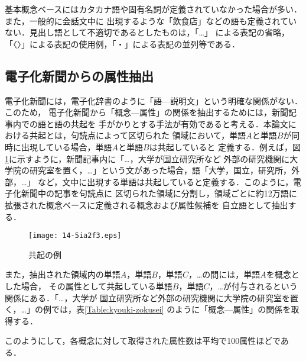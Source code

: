 \documentclass[japanese]{jnlp_1.3e}
\begin{document}
\begin{table}[t]

\end{table}

基本概念ベースにはカタカナ語や固有名詞が定義されていなかった場合が多い．また，一般的に会話文中に
出現するような「飲食店」などの語も定義されていない．見出し語として不適切であるとしたものは，「…」
による表記の省略，「〈〉」による表記の使用例，「・」による表記の並列等である．



\subsection{電子化新聞からの属性抽出} \label{get-attribute}

電子化新聞には，電子化辞書のように「語—説明文」という明確な関係がない．このため，
電子化新聞から「概念—属性」の関係を抽出するためには，新聞記事内での語と語の共起を
手がかりとする手法が有効であると考える\cite{hirose2002}．本論文における共起とは，句読点によって区切られた
領域において，単語$A$と単語$B$が同時に出現している場合，単語$A$と単語$B$は共起していると
定義する．例えば，図\ref{fig:news-kyouki}に示すように，新聞記事内に「…，大学が国立研究所など
外部の研究機関に大学院の研究室を置く，…」という文があった場合，語「大学，国立，研究所，外部，…」
など，文中に出現する単語は共起していると定義する．このように，電子化新聞中の記事を句読点に
区切られた領域に分割し，領域ごとに約12万語に拡張された概念ベースに定義される概念および属性候補を
自立語として抽出する．

\begin{figure}[b]
	\begin{center}
	\texttt{[image: 14-5ia2f3.eps]}
		\caption{共起の例}
		\label{fig:news-kyouki}
	\end{center}
\end{figure}

また，抽出された領域内の単語$A$，単語$B$，単語$C$，…の間には，単語$A$を概念とした場合，
その属性として共起している単語$B$，単語$C$，…が付与されるという関係にある．「…，大学が
国立研究所など外部の研究機関に大学院の研究室を置く，…」の例では，表\ref{Table:kyouki-zokusei}
のように「概念—属性」の関係を取得する．

\begin{table}[t]

\end{table}

このようにして，各概念に対して取得された属性数は平均で100属性ほどである．
\end{document}
